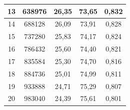 \begin{table}[]
{\begin{tabular}{ccccc}
			13                & 638976                                                                 & 26,35                                                                        & 73,65                                                                             & 0,832                   \\ \hline
			14                & 688128                                                                 & 26,09                                                                        & 73,91                                                                             & 0,828                   \\ \hline
			15                & 737280                                                                 & 25,83                                                                        & 74,17                                                                             & 0,824                   \\ \hline
			16                & 786432                                                                 & 25,60                                                                        & 74,40                                                                             & 0,821                   \\ \hline
			17                & 835584                                                                 & 25,30                                                                        & 74,70                                                                             & 0,816                   \\ \hline
			18                & 884736                                                                 & 25,01                                                                        & 74,99                                                                             & 0,811                   \\ \hline
			19                & 933888                                                                 & 24,71                                                                        & 75,29                                                                             & 0,807                   \\ \hline
			20                & 983040                                                                 & 24,39                                                                        & 75,61                                                                             & 0,801                   \\ \hline

\end{tabular}}
\end{table}
